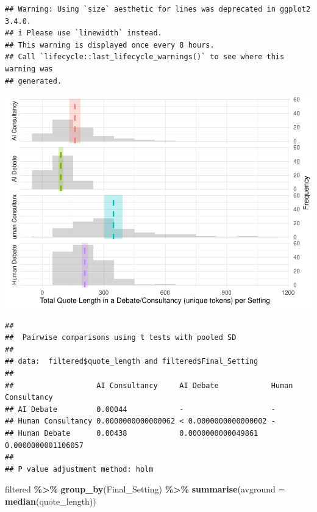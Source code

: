 \documentclass[
]{article}
\newenvironment{Shaded}{\begin{snugshade}}{\end{snugshade}}
\newcommand{\AttributeTok}[1]{\textcolor[rgb]{0.13,0.29,0.53}{#1}}
\newcommand{\FunctionTok}[1]{\textcolor[rgb]{0.13,0.29,0.53}{\textbf{#1}}}
\newcommand{\NormalTok}[1]{#1}
\newcommand{\SpecialCharTok}[1]{\textcolor[rgb]{0.81,0.36,0.00}{\textbf{#1}}}
\begin{document}
\begin{verbatim}
## Warning: Using `size` aesthetic for lines was deprecated in ggplot2 3.4.0.
## i Please use `linewidth` instead.
## This warning is displayed once every 8 hours.
## Call `lifecycle::last_lifecycle_warnings()` to see where this warning was
## generated.
\end{verbatim}

\includegraphics[width=1\linewidth]{debate-2309_files/figure-latex/quote_length graph-6}

\begin{Shaded}
\end{Shaded}

\begin{verbatim}
## 
##  Pairwise comparisons using t tests with pooled SD 
## 
## data:  filtered$quote_length and filtered$Final_Setting 
## 
##                   AI Consultancy     AI Debate            Human Consultancy 
## AI Debate         0.00044            -                    -                 
## Human Consultancy 0.0000000000000062 < 0.0000000000000002 -                 
## Human Debate      0.00438            0.0000000000049861   0.0000000001106057
## 
## P value adjustment method: holm
\end{verbatim}

\begin{Shaded}
\begin{Highlighting}[]
\NormalTok{filtered }\SpecialCharTok{\%\textgreater{}\%} \FunctionTok{group\_by}\NormalTok{(Final\_Setting) }\SpecialCharTok{\%\textgreater{}\%} \FunctionTok{summarise}\NormalTok{(}\AttributeTok{avground =} \FunctionTok{median}\NormalTok{(quote\_length))}
\end{Highlighting}
\end{Shaded}
\end{document}
